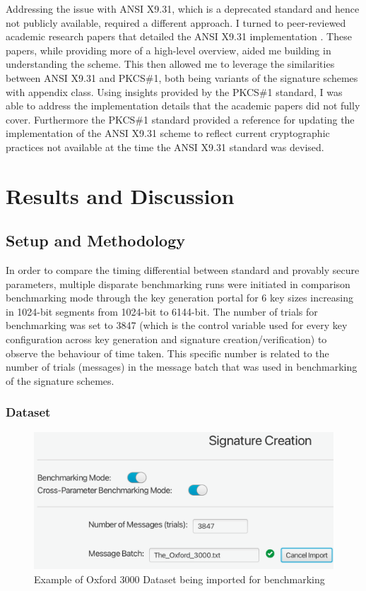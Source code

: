 \documentclass[]{final_report}
\theoremstyle{definition}
\begin{document}
Addressing the issue with ANSI X9.31, which is a deprecated standard and hence not publicly available, required a different approach. I turned to peer-reviewed academic research papers that detailed the ANSI X9.31 implementation \cite{10.1007/978-3-030-64357-7_5}. These papers, while providing more of a high-level overview, aided me building in understanding the scheme. This then allowed me to leverage the similarities between ANSI X9.31 and PKCS\#1, both being variants of the signature schemes with appendix class. Using insights provided by the PKCS\#1 standard, I was able to address the implementation details that the academic papers did not fully cover. Furthermore the PKCS\#1 standard provided a reference for updating the implementation of the ANSI X9.31 scheme to reflect current cryptographic practices not available at the time the ANSI X9.31 standard was devised. 








\chapter{Results and Discussion}

\section{Setup and Methodology}
In order to compare the timing differential between standard and provably secure parameters, multiple disparate benchmarking runs were initiated in comparison benchmarking mode through the key generation portal for 6 key sizes increasing in 1024-bit segments from 1024-bit to 6144-bit. The number of trials for benchmarking was set to 3847 (which is the control variable used for every key configuration across key generation and signature creation/verification) to observe the behaviour of time taken. This specific number is related to the number of trials (messages) in the message batch that was used in benchmarking of the signature schemes.

\subsection{Dataset}

\begin{figure}[H]
    \centering
    \includegraphics[width=\textwidth]{main_pictures/ui/dataset.png}
    \caption{Example of Oxford 3000 Dataset being imported for benchmarking}
\end{figure}
\end{document}
